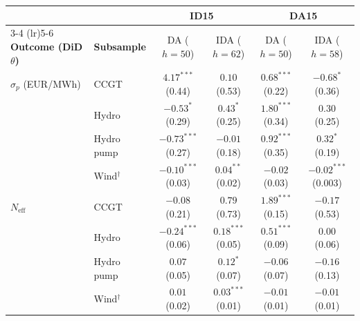 \documentclass[11pt]{article}
\begin{document}
\begin{center}
\footnotesize
\setlength{\tabcolsep}{4pt}
\begin{tabular}{l l c c c c}
\toprule
                                &              & \multicolumn{2}{c}{\textbf{ID15}} & \multicolumn{2}{c}{\textbf{DA15}} \\
\cmidrule(lr){3-4} \cmidrule(lr){5-6}
\textbf{Outcome (DiD $\theta$)} & \textbf{Subsample} & DA ($h{=}50$) & IDA ($h{=}62$) & DA ($h{=}50$) & IDA ($h{=}58$) \\
\midrule
$\sigma_p$ (EUR/MWh)            & CCGT          & $4.17^{***}$ (0.44)  & $0.10$ (0.53)          & $0.68^{***}$ (0.22)  & $-0.68^{*}$ (0.36) \\
                                & Hydro         & $-0.53^{*}$ (0.29)   & $0.43^{*}$ (0.25)      & $1.80^{***}$ (0.34)  & $0.30$ (0.25) \\
                                & Hydro pump    & $-0.73^{***}$ (0.27) & $-0.01$ (0.18)         & $0.92^{***}$ (0.35)  & $0.32^{*}$ (0.19) \\
                                & Wind$^{\dagger}$ & $-0.10^{***}$ (0.03) & $0.04^{**}$ (0.02)  & $-0.02$ (0.03)       & $-0.02^{***}$ (0.003) \\
\addlinespace
$N_{\text{eff}}$                & CCGT          & $-0.08$ (0.21)       & $0.79$ (0.73)          & $1.89^{***}$ (0.15)  & $-0.17$ (0.53) \\
                                & Hydro         & $-0.24^{***}$ (0.06) & $0.18^{***}$ (0.05)    & $0.51^{***}$ (0.09)  & $0.00$ (0.06) \\
                                & Hydro pump    & $0.07$ (0.05)        & $0.12^{*}$ (0.07)      & $-0.06$ (0.07)       & $-0.16$ (0.13) \\
                                & Wind$^{\dagger}$ & $0.01$ (0.02)     & $0.03^{***}$ (0.01)    & $-0.01$ (0.01)       & $-0.01$ (0.01) \\
\bottomrule
\end{tabular}
\end{center}
\end{document}
